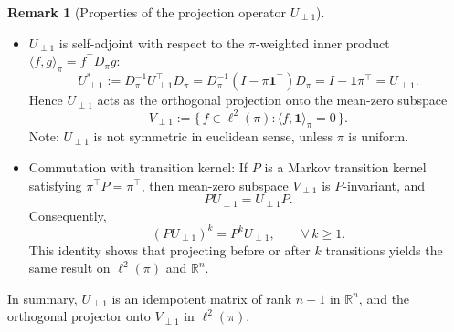 \documentclass[preprint]{imsart}
\theoremstyle{plain}
\theoremstyle{definition}
\newtheorem{remark}{Remark}
\begin{document}
\begin{remark}[Properties of the projection operator $U_{\perp 1}$]
\begin{itemize}
        \[
            \forall{f} \in \mathbb{R}^{n}:U_{\perp 1}f = f - \pi(f)\mathbf{1},
            \qquad 
            \text{where } \pi(f) := \sum_{i=1}^{n}\pi_i f_i \implies \langle U_{\perp 1}f,1\rangle_{\pi}=0.
        \]
    Note: Conventionally, centered vector valued $f$ i.e., $f-\pi(f)\mathbf{1}$ is denoted by $f-\pi(f)$.  
    \item $U_{\perp 1}$ is self-adjoint with respect to the $\pi$-weighted inner product $\langle f,g\rangle_{\pi} = f^{\top}D_{\pi}g$: 
    \[
        U_{\perp 1}^{*}
        := D_{\pi}^{-1}U_{\perp 1}^{\top}D_{\pi}
        = D_{\pi}^{-1}(I - \pi\mathbf{1}^{\top})D_{\pi}
        = I - \mathbf{1}\pi^{\top}
        = U_{\perp 1}.
    \]
    Hence $U_{\perp 1}$ acts as the orthogonal projection onto the mean-zero subspace
    \[
        V_{\perp 1} := \{\,f \in \ell^{2}(\pi) : \langle f, \mathbf{1}\rangle_{\pi} = 0\,\}.
    \]
    Note: $U_{\perp 1}$ is not symmetric in euclidean sense, unless $\pi$ is uniform.
    \item Commutation with transition kernel:
    If $P$ is a Markov transition kernel satisfying $\pi^{\top}P = \pi^{\top}$,
    then mean-zero subspace $V_{\perp 1}$ is $P$-invariant, and
        \[
            PU_{\perp 1} = U_{\perp 1}P.
        \]
    Consequently,
        \[
            (PU_{\perp 1})^{k} = P^{k}U_{\perp 1}, \qquad \forall\, k \ge 1.
        \]
    This identity shows that projecting before or after $k$ transitions yields the same result on $\ell^{2}(\pi)$ and $\mathbb{R}^{n}$.    
\end{itemize}
In summary, $U_{\perp 1}$ is an idempotent matrix of rank $n-1$ in $\mathbb{R}^{n}$,
    and the orthogonal projector onto $V_{\perp 1}$ in $\ell^{2}(\pi)$.
\end{remark}
\end{document}
